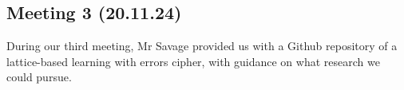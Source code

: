 \documentclass{article}
\begin{document}
\subsection{Meeting 3 (20.11.24)}
During our third meeting, Mr Savage provided us with a Github repository of a
lattice-based learning with errors cipher, with guidance on what research we
could pursue.



\end{document}
